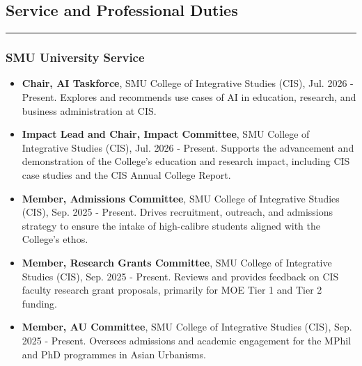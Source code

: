\documentclass[10pt,a4paper]{article}
\begin{document}
\begin{small}




\subsection*{Service and Professional Duties}
\hrule
\vspace{0.2cm}

\subsubsection*{SMU University Service}

\begin{itemize}
\item
\textbf{Chair, AI Taskforce}, SMU College of Integrative Studies (CIS), Jul. 2026 - Present. Explores and recommends use cases of AI in education, research, and business administration at CIS.
\item
\textbf{Impact Lead and Chair, Impact Committee}, SMU College of Integrative Studies (CIS), Jul. 2026 - Present. Supports the advancement and demonstration of the College's education and research impact, including CIS case studies and the CIS Annual College Report.
\item
\textbf{Member, Admissions Committee}, SMU College of Integrative Studies (CIS), Sep. 2025 - Present. Drives recruitment, outreach, and admissions strategy to ensure the intake of high-calibre students aligned with the College's ethos.
\item
\textbf{Member, Research Grants Committee}, SMU College of Integrative Studies (CIS), Sep. 2025 - Present. Reviews and provides feedback on CIS faculty research grant proposals, primarily for MOE Tier 1 and Tier 2 funding.
\item
\textbf{Member, AU Committee}, SMU College of Integrative Studies (CIS), Sep. 2025 - Present. Oversees admissions and academic engagement for the MPhil and PhD programmes in Asian Urbanisms.
\end{itemize}


\end{small}
\end{document}
